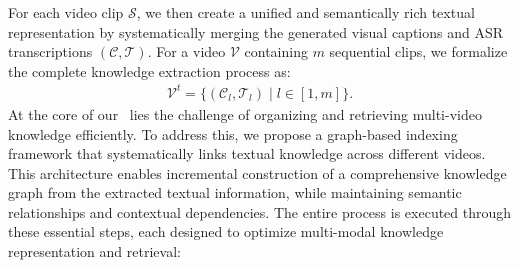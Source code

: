 For each video clip $\mathcal{S}$, we then create a unified and semantically rich textual representation by systematically merging the generated visual captions and ASR transcriptions $(\mathcal{C}, \mathcal{T})$. For a video $\mathcal{V}$ containing $m$ sequential clips, we formalize the complete knowledge extraction process as:
\begin{align}
    \mathcal{V}^{t} = \{(\mathcal{C}_l, \mathcal{T}_l) \mid l \in [1, m]\}.
\end{align}
At the core of our \model\ lies the challenge of organizing and retrieving multi-video knowledge efficiently. To address this, we propose a graph-based indexing framework that systematically links textual knowledge across different videos. This architecture enables incremental construction of a comprehensive knowledge graph from the extracted textual information, while maintaining semantic relationships and contextual dependencies. The entire process is executed through these essential steps, each designed to optimize multi-modal knowledge representation and retrieval:
